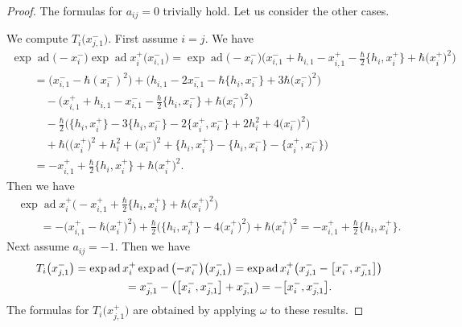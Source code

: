 \documentclass[11pt]{article}
\theoremstyle{definition}
\numberwithin{equation}{section}
\DeclareMathOperator{\ad}{ad}
\begin{document}
\begin{proof}The formulas for $a_{ij}=0$ trivially hold. Let us consider the other cases.

We compute $T_i\big(x_{j,1}^-\big)$. First assume $i=j$. We have
\begin{gather*}
\exp\ad \big({-}x_i^-\big)\exp\ad x_i^+\big(x_{i,1}^-\big) = \exp\ad \big({-}x_i^-\big)\big(x_{i,1}^- + h_{i,1}-x_{i,1}^+ -\tfrac{\hbar}{2}\big\{ h_i, x_i^+\big\} + \hbar \big(x_i^+\big)^2\big)\\
\qquad {}= \big(x_{i,1}^- - \hbar(x_i^-)^2\big)+\big(h_{i,1}-2x_{i,1}^- - \hbar\big\{ h_i, x_i^- \big\} + 3\hbar \big(x_i^-\big)^2\big)\\
\qquad\quad{}-\big(x_{i,1}^+ + h_{i,1}-x_{i,1}^--\tfrac{\hbar}{2}\big\{ h_i, x_i^-\big\} + \hbar \big(x_i^-\big)^2\big)\\
\qquad\quad{}-\tfrac{\hbar}{2}\big(\big\{h_i,x_i^+\big\} - 3\big\{h_i,x_i^-\big\} - 2\big\{x_i^+,x_i^-\big\} + 2h_i^2 + 4\big(x_i^-\big)^2\big)\\
\qquad\quad{} +\hbar\big(\big(x_i^+\big)^2 + h_i^2 + \big(x_i^-\big)^2+ \big\{h_i,x_i^+\big\} - \big\{h_i,x_i^-\big\} - \big\{x_i^+,x_i^-\big\}\big)\\
\qquad{}=-x_{i,1}^+ + \tfrac{\hbar}{2}\big\{h_i,x_i^+\big\} +\hbar \big(x_i^+\big)^2.
\end{gather*}
Then we have
\begin{gather*}
\exp\ad x_i^+\big({-}x_{i,1}^+ + \tfrac{\hbar}{2}\big\{h_i,x_i^+\big\} +\hbar \big(x_i^+\big)^2\big) \\
\qquad {}= -\big( x_{i,1}^+-\hbar \big(x_i^+\big)^2 \big) + \tfrac{\hbar}{2}\big( \big\{h_i,x_i^+\big\} - 4\big(x_i^+\big)^2 \big) + \hbar \big(x_i^+\big)^2
 =-x_{i,1}^++\tfrac{\hbar}{2}\big\{h_i,x_i^+\big\}.
\end{gather*}
Next assume $a_{ij}=-1$. Then we have
\begin{gather*}
T_i\big(x_{j,1}^-\big)=\exp\ad x_i^+\exp\ad \big({-}x_i^-\big)\big(x_{j,1}^-\big) = \exp\ad x_i^+\big(x_{j,1}^- - \big[x_i^-,x_{j,1}^-\big]\big)\\
\hphantom{T_i\big(x_{j,1}^-\big)}{} = x_{j,1}^- - \big(\big[x_i^-,x_{j,1}^-\big]+x_{j,1}^-)=-\big[x_i^-,x_{j,1}^-\big]. %
\end{gather*}
The formulas for $T_i\big(x_{j,1}^+\big)$ are obtained by applying $\omega$ to these results.


\end{proof}
\end{document}
